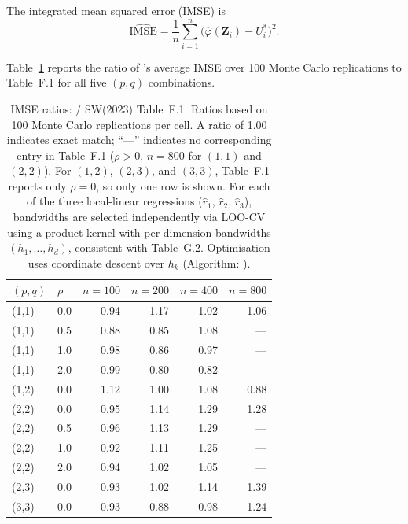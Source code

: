 \documentclass[article]{jss}
\begin{document}
The integrated mean squared error (IMSE) is
%
\begin{equation}
  \widehat{\mathrm{IMSE}} = \frac{1}{n}\sum_{i=1}^n
  \bigl(\hat{\varphi}(\mathbf{Z}_i) - U^*_i\bigr)^2.
\end{equation}

Table~\ref{tab:imse} reports the ratio of 's average IMSE
over 100 Monte Carlo replications to \citet{SimarWilson2023} Table~F.1
for all five $(p,q)$ combinations.

\begin{table}[t!]
\centering
\caption{\label{tab:imse} IMSE ratios:  / SW(2023) Table~F.1.
         Ratios based on 100 Monte Carlo replications per cell.
         A ratio of 1.00 indicates exact match; ``---'' indicates
         no corresponding entry in Table~F.1 ($\rho > 0$, $n = 800$ for
         $(1,1)$ and $(2,2)$).  For $(1,2)$, $(2,3)$, and $(3,3)$,
         Table~F.1 reports only $\rho = 0$, so only one row is shown.
         For each of the three local-linear regressions
         ($\hat{r}_1$, $\hat{r}_2$, $\hat{r}_3$), bandwidths are selected
         independently via LOO-CV using a product kernel with per-dimension
         bandwidths $(h_1,\ldots,h_d)$, consistent with \citet{SimarWilson2023}
         Table~G.2.  Optimisation uses coordinate descent over $h_k$
         (Algorithm: ).}
\begin{tabular}{llrrrr}
\toprule
$(p,q)$ & $\rho$ & $n=100$ & $n=200$ & $n=400$ & $n=800$ \\
\midrule
(1,1) & 0.0 & 0.94 & 1.17 & 1.02 & 1.06 \\
(1,1) & 0.5 & 0.88 & 0.85 & 1.08 & --- \\
(1,1) & 1.0 & 0.98 & 0.86 & 0.97 & --- \\
(1,1) & 2.0 & 0.99 & 0.80 & 0.82 & --- \\
\midrule
(1,2) & 0.0 & 1.12 & 1.00 & 1.08 & 0.88 \\
\midrule
(2,2) & 0.0 & 0.95 & 1.14 & 1.29 & 1.28 \\
(2,2) & 0.5 & 0.96 & 1.13 & 1.29 & --- \\
(2,2) & 1.0 & 0.92 & 1.11 & 1.25 & --- \\
(2,2) & 2.0 & 0.94 & 1.02 & 1.05 & --- \\
\midrule
(2,3) & 0.0 & 0.93 & 1.02 & 1.14 & 1.39 \\
\midrule
(3,3) & 0.0 & 0.93 & 0.88 & 0.98 & 1.24 \\
\bottomrule
\end{tabular}
\end{table}
\end{document}
